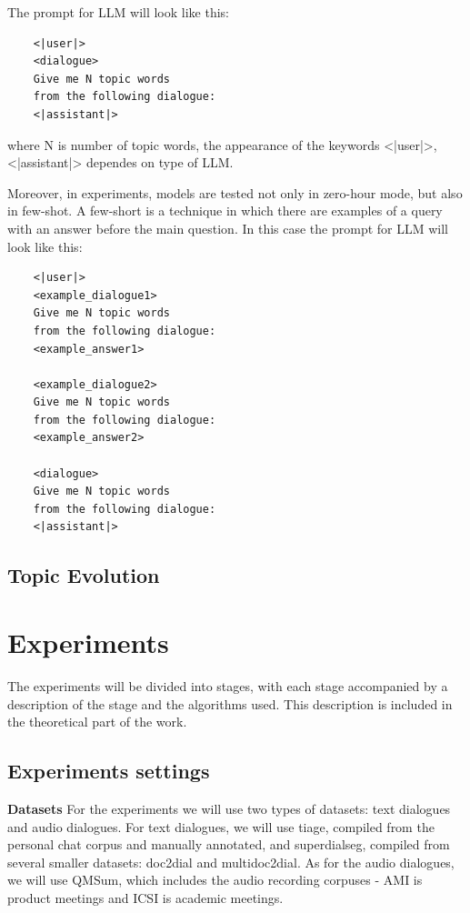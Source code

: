 \documentclass[PMI,VKR]{HSEUniversity}
\begin{document}
The prompt for LLM will look like this:

\begin{lstlisting}
    <|user|> 
    <dialogue> 
    Give me N topic words 
    from the following dialogue:
    <|assistant|>
\end{lstlisting}

where N is number of topic words, the appearance of the keywords <|user|>, <|assistant|> dependes on type of LLM.

Moreover, in experiments, models are tested not only in zero-hour mode, but also in few-shot.
A few-short is a technique in which there are examples of a query with an answer before the main question.
In this case the prompt for LLM will look like this:

\begin{lstlisting}
    <|user|> 
    <example_dialogue1> 
    Give me N topic words 
    from the following dialogue:
    <example_answer1>

    <example_dialogue2> 
    Give me N topic words 
    from the following dialogue:
    <example_answer2>

    <dialogue> 
    Give me N topic words 
    from the following dialogue:
    <|assistant|>
\end{lstlisting}

\section{Topic Evolution}



\chapter{Experiments}

The experiments will be divided into stages, with each stage accompanied by a description of the stage and the algorithms used. 
This description is included in the theoretical part of the work.

\section{Experiments settings}

\textbf{Datasets}
For the experiments we will use two types of datasets: text dialogues and audio dialogues. 
For text dialogues, we will use tiage, compiled from the personal chat corpus and manually annotated, and superdialseg, compiled from several smaller datasets: doc2dial and multidoc2dial. 
As for the audio dialogues, we will use QMSum, which includes the audio recording corpuses - AMI is product meetings and ICSI is academic meetings. \\
\end{document}
